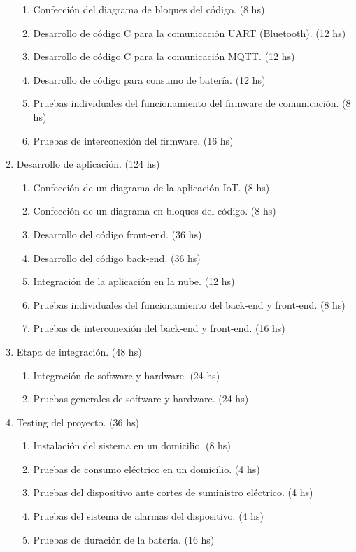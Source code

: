 \documentclass[
11pt, %
]{charter}
\begin{document}
\begin{enumerate}
\begin{enumerate}
	\item Confección del diagrama de bloques del código. (8 hs)
	\item Desarrollo de código C para la comunicación UART (Bluetooth). (12 hs)
	\item Desarrollo de código C para la comunicación MQTT.	(12 hs)
	\item Desarrollo de código para consumo de batería.	(12 hs)
	\item Pruebas individuales del funcionamiento del firmware de comunicación. (8 hs)
	\item Pruebas de interconexión del firmware. (16 hs)
	\end{enumerate}
\item Desarrollo de aplicación. (124 hs)
	\begin{enumerate}
	\item Confección de un diagrama de la aplicación IoT. (8 hs)
	\item Confección de un diagrama en bloques del código. (8 hs)
	\item Desarrollo del código front-end. (36 hs)
	\item Desarrollo del código back-end. (36 hs)
	\item Integración de la aplicación en la nube. (12 hs)
	\item Pruebas individuales del funcionamiento del back-end y front-end. (8 hs)
	\item Pruebas de interconexión del back-end y front-end. (16 hs)
	\end{enumerate}

\item Etapa de integración. (48 hs)
	\begin{enumerate}
	\item Integración de software y  hardware. (24 hs)
	\item Pruebas generales de software y  hardware. (24 hs)
	\end{enumerate}
	
\item Testing del proyecto. (36 hs)
	\begin{enumerate}
	\item Instalación del sistema en un domicilio. (8 hs)
	\item Pruebas de consumo eléctrico en un domicilio.	(4 hs)
	\item Pruebas del dispositivo ante cortes de suministro eléctrico.	(4 hs)
	\item Pruebas del sistema de alarmas del dispositivo. (4 hs)
	\item Pruebas de duración de la batería. (16 hs)
	\end{enumerate}
	

\end{enumerate}
\end{document}
